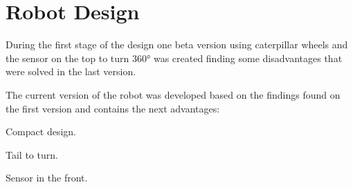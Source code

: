 \documentclass[12pt]{article}
\begin{document}
\section{Robot Design}

During the first stage of the design one beta version using caterpillar wheels and the sensor on the top to turn 360° was created finding some disadvantages that were solved in the last version.

The current version of the robot was developed based on the findings found on the first version and contains the next advantages:

Compact design.

Tail to turn.

Sensor in the front.
\end{document}
